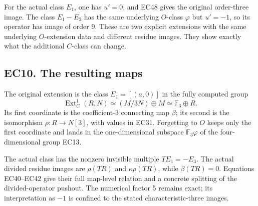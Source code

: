 \documentclass[
  10pt,
]{article}
\begin{document}
For the actual class \(E_1\), one has \(u'=0\), and EC48 gives the
original order-three image. The class \(E_1-E_2\) has the same
underlying \(O\)-class \(\varphi\) but \(u'=-1\), so its operator has
image of order 9. These are two explicit extensions with the same
underlying \(O\)-extension data and different residue images. They show
exactly what the additional \(C\)-class can change.

\subsection{EC10. The resulting maps}\label{ec10.-the-resulting-maps}

The original extension is the class \(E_1=[(a,0)]\) in the fully
computed group \[
\operatorname{Ext}^1_C(R,N)\simeq(M/3N)\oplus M
\simeq\mathbb F_3\oplus R.
\] Its first coordinate is the coefficient-3 connecting map \(\beta\);
its second is the isomorphism \(\rho:R\to N[3]\), with values in EC31.
Forgetting to \(O\) keeps only the first coordinate and lands in the
one-dimensional subspace \(\mathbb F_3\varphi\) of the four-dimensional
group EC13.

The actual class has the nonzero invisible multiple \(TE_1=-E_3\). The
actual divided residue images are \(\rho(TR)\) and \(\kappa\rho(TR)\),
while \(\beta(TR)=0\). Equations EC40--EC42 give their full map-level
relation and a concrete splitting of the divided-operator pushout. The
numerical factor 5 remains exact; its interpretation as \(-1\) is
confined to the stated characteristic-three images.
\end{document}
